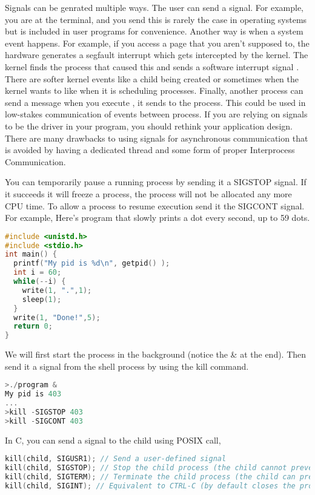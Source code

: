 Signals can be genrated multiple ways. The user can send a signal. For example, you are at the terminal, and you send  this is rarely the case in operating systems but is included in user programs for convenience. Another way is when a system event happens. For example, if you access a page that you aren't supposed to, the hardware generates a segfault interrupt which gets intercepted by the kernel. The kernel finds the process that caused this and sends a software interrupt signal . There are softer kernel events like a child being created or sometimes when the kernel wants to like when it is scheduling processes. Finally, another process can send a message when you execute , it sends  to the process. This could be used in low-stakes communication of events between process. If you are relying on signals to be the driver in your program, you should rethink your application design. There are many drawbacks to using signals for asynchronous communication that is avoided by having a dedicated thread and some form of proper Interprocess Communication.

You can temporarily pause a running process by sending it a SIGSTOP signal. If it succeeds it will freeze a process, the process will not be allocated any more CPU time. To allow a process to resume execution send it the SIGCONT signal. For example, Here's program that slowly prints a dot every second, up to 59 dots.

\begin{lstlisting}[language=C]
#include <unistd.h>
#include <stdio.h>
int main() {
  printf("My pid is %d\n", getpid() );
  int i = 60;
  while(--i) { 
    write(1, ".",1);
    sleep(1);
  }
  write(1, "Done!",5);
  return 0;
}
\end{lstlisting}

We will first start the process in the background (notice the \& at the end). Then send it a signal from the shell process by using the kill command.

\begin{lstlisting}[language=C]
>./program &
My pid is 403
...
>kill -SIGSTOP 403
>kill -SIGCONT 403
\end{lstlisting}

In C, you can send a signal to the child using  POSIX call,

\begin{lstlisting}[language=C]
kill(child, SIGUSR1); // Send a user-defined signal
kill(child, SIGSTOP); // Stop the child process (the child cannot prevent this)
kill(child, SIGTERM); // Terminate the child process (the child can prevent this)
kill(child, SIGINT); // Equivalent to CTRL-C (by default closes the process)
\end{lstlisting}

